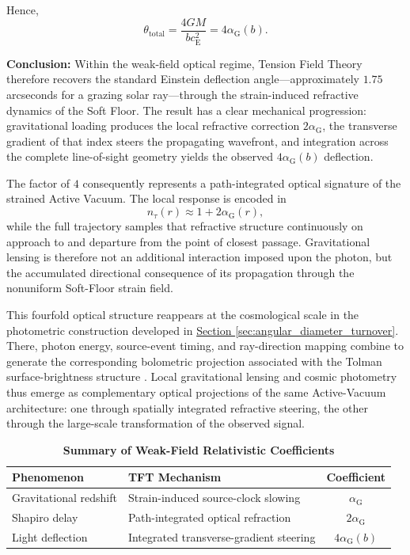 Hence,
\begin{equation}
    \boxed{ \theta_{\mathrm{total}} = \frac{4GM}{b c_{\mathrm{E}}^2} = 4\alpha_{\mathrm{G}}(b) }.
\end{equation}

\vspace{0.5em}
\noindent\textbf{Conclusion:} Within the weak-field optical regime, Tension Field Theory therefore recovers the standard Einstein deflection angle---approximately $1.75$ arcseconds for a grazing solar ray---through the strain-induced refractive dynamics of the Soft Floor. The result has a clear mechanical progression: gravitational loading produces the local refractive correction $2\alpha_{\mathrm{G}}$, the transverse gradient of that index steers the propagating wavefront, and integration across the complete line-of-sight geometry yields the observed $4\alpha_{\mathrm{G}}(b)$ deflection.

The factor of $4$ consequently represents a path-integrated optical signature of the strained Active Vacuum. The local response is encoded in
\begin{equation}
    n_\tau(r) \approx 1+2\alpha_{\mathrm{G}}(r),
\end{equation}
while the full trajectory samples that refractive structure continuously on approach to and departure from the point of closest passage. Gravitational lensing is therefore not an additional interaction imposed upon the photon, but the accumulated directional consequence of its propagation through the nonuniform Soft-Floor strain field.

This fourfold optical structure reappears at the cosmological scale in the photometric construction developed in \hyperref[sec:angular_diameter_turnover]{Section \ref*{sec:angular_diameter_turnover}}. There, photon energy, source-event timing, and ray-direction mapping combine to generate the corresponding bolometric projection associated with the Tolman surface-brightness structure \cite{Tolman_1930}. Local gravitational lensing and cosmic photometry thus emerge as complementary optical projections of the same Active-Vacuum architecture: one through spatially integrated refractive steering, the other through the large-scale transformation of the observed signal.

\begin{table}[H]
    \centering
    \caption{\textbf{Summary of Weak-Field Relativistic Coefficients}}
    \label{tab:relativistic_coefficients}
    \renewcommand{\arraystretch}{1.5}
    \begin{tabular}{@{}llc@{}}
        \toprule
        \textbf{Phenomenon} & \textbf{TFT Mechanism} & \textbf{Coefficient} \\
        \midrule
        Gravitational redshift & Strain-induced source-clock slowing & $\alpha_{\mathrm{G}}$ \\
        Shapiro delay & Path-integrated optical refraction & $2\alpha_{\mathrm{G}}$ \\
        Light deflection & Integrated transverse-gradient steering & $4\alpha_{\mathrm{G}}(b)$ \\
        \bottomrule
    \end{tabular}
\end{table}